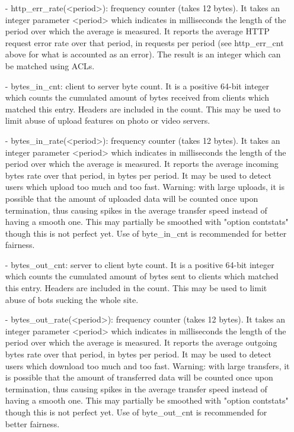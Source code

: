 {\begin{itemize}
  \item[-] http\_err\_rate(<period>): frequency counter (takes 12 bytes). It takes an
      integer parameter <period> which indicates in milliseconds the length
      of the period over which the average is measured. It reports the average
      HTTP request error rate over that period, in requests per period (see
      http\_err\_cnt above for what is accounted as an error). The result is an
      integer which can be matched using ACLs.

  \item[-] bytes\_in\_cnt: client to server byte count. It is a positive 64-bit
      integer which counts the cumulated amount of bytes received from clients
      which matched this entry. Headers are included in the count. This may be
      used to limit abuse of upload features on photo or video servers.

  \item[-] bytes\_in\_rate(<period>): frequency counter (takes 12 bytes). It takes an
      integer parameter <period> which indicates in milliseconds the length
      of the period over which the average is measured. It reports the average
      incoming bytes rate over that period, in bytes per period. It may be used
      to detect users which upload too much and too fast. Warning: with large
      uploads, it is possible that the amount of uploaded data will be counted
      once upon termination, thus causing spikes in the average transfer speed
      instead of having a smooth one. This may partially be smoothed with
      "option contstats" though this is not perfect yet. Use of byte\_in\_cnt is
      recommended for better fairness.

  \item[-] bytes\_out\_cnt: server to client byte count. It is a positive 64-bit
      integer which counts the cumulated amount of bytes sent to clients which
      matched this entry. Headers are included in the count. This may be used
      to limit abuse of bots sucking the whole site.

  \item[-] bytes\_out\_rate(<period>): frequency counter (takes 12 bytes). It takes
      an integer parameter <period> which indicates in milliseconds the length
      of the period over which the average is measured. It reports the average
      outgoing bytes rate over that period, in bytes per period. It may be used
      to detect users which download too much and too fast. Warning: with large
      transfers, it is possible that the amount of transferred data will be
      counted once upon termination, thus causing spikes in the average
      transfer speed instead of having a smooth one. This may partially be
      smoothed with "option contstats" though this is not perfect yet. Use of
      byte\_out\_cnt is recommended for better fairness.
  \end{itemize}

}
